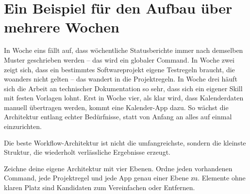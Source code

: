\section{Ein Beispiel für den Aufbau über mehrere Wochen}

In Woche eins fällt auf, dass wöchentliche Statusberichte immer nach demselben Muster geschrieben werden -- das wird ein globaler Command. In Woche zwei zeigt sich, dass ein bestimmtes Softwareprojekt eigene Testregeln braucht, die woanders nicht gelten -- das wandert in die Projektregeln. In Woche drei häuft sich die Arbeit an technischer Dokumentation so sehr, dass sich ein eigener Skill mit festen Vorlagen lohnt. Erst in Woche vier, als klar wird, dass Kalenderdaten manuell übertragen werden, kommt eine Kalender-App dazu. So wächst die Architektur entlang echter Bedürfnisse, statt von Anfang an alles auf einmal einzurichten.

\begin{merke}
Die beste Workflow-Architektur ist nicht die umfangreichste, sondern die kleinste Struktur, die wiederholt verlässliche Ergebnisse erzeugt.
\end{merke}

\begin{praxis}
Zeichne deine eigene Architektur mit vier Ebenen. Ordne jeden vorhandenen Command, jede Projektregel und jede App genau einer Ebene zu. Elemente ohne klaren Platz sind Kandidaten zum Vereinfachen oder Entfernen.
\end{praxis}
